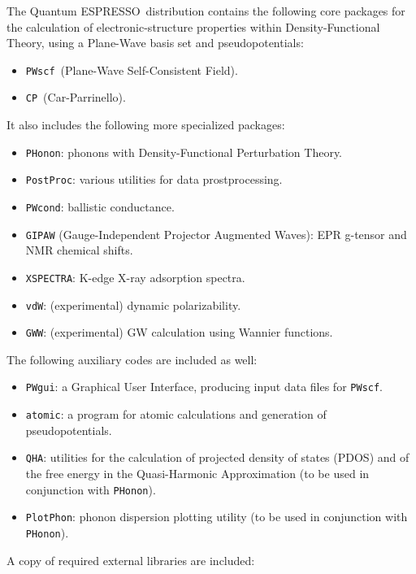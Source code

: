 \documentclass[12pt,a4paper]{article}
\def\qe{{\sc Quantum ESPRESSO}}
\def\PWscf{\texttt{PWscf}}
\def\PHonon{\texttt{PHonon}}
\def\CP{\texttt{CP}}
\def\PostProc{\texttt{PostProc}}
\begin{document}
The \qe\ distribution contains the following core packages 
for the calculation of electronic-structure properties within
Density-Functional Theory, using a Plane-Wave basis set and pseudopotentials:
\begin{itemize}
  \item \PWscf\ (Plane-Wave Self-Consistent Field).
  \item \CP\ (Car-Parrinello).
\end{itemize}
It also includes the following more specialized packages:
\begin{itemize}
  \item \PHonon:
        phonons with Density-Functional Perturbation Theory.
  \item \PostProc: various utilities for data prostprocessing.
  \item \texttt{PWcond}:
        ballistic conductance.
  \item \texttt{GIPAW} 
  (Gauge-Independent Projector Augmented Waves):
        EPR g-tensor and NMR chemical shifts.
  \item \texttt{XSPECTRA}:
        K-edge X-ray adsorption spectra.
  \item \texttt{vdW}:
        (experimental) dynamic polarizability. 
  \item \texttt{GWW}:
        (experimental) GW calculation using Wannier functions.
\end{itemize}
The following auxiliary codes are included as well:
\begin{itemize}
\item \texttt{PWgui}:
      a Graphical User Interface, producing input data files for 
      \PWscf.
\item \texttt{atomic}:
      a program for atomic calculations and generation of pseudopotentials.
\item \texttt{QHA}:
      utilities for the calculation of projected density of states (PDOS)
      and of the free energy in the Quasi-Harmonic Approximation (to be
      used in conjunction with \PHonon).
\item \texttt{PlotPhon}:
      phonon dispersion plotting utility (to be
      used in conjunction with \PHonon).
\end{itemize}
A copy of required external libraries are included:
\end{document}
